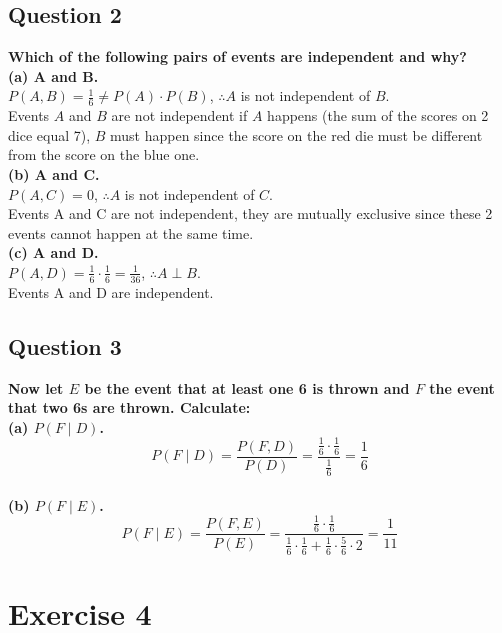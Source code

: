 \documentclass[
]{book}
\begin{document}
\section{Question 2}\label{question-2-1}

\textbf{Which of the following pairs of events are independent and why?}\\
\textbf{(a) A and B.}\\
\(P(A,B) = \frac{1}{6} \neq P(A) \cdot P(B)\), \(\therefore A\) is not independent of \(B\).\\
Events \(A\) and \(B\) are not independent if \(A\) happens (the sum of the scores on 2 dice equal 7), \(B\) must happen since the score on the red die must be different from the score on the blue one.\\

\textbf{(b) A and C.}\\
\(P(A,C) = 0\), \(\therefore A\) is not independent of \(C\).\\
Events A and C are not independent, they are mutually exclusive since these 2 events cannot happen at the same time.\\

\textbf{(c) A and D.}\\
\(P(A,D) = \frac{1}{6} \cdot \frac{1}{6} = \frac{1}{36}\), \(\therefore A \perp B\).\\
Events A and D are independent.

\section{Question 3}\label{question-3-1}

\textbf{Now let \(E\) be the event that at least one 6 is thrown and \(F\) the event that two 6s are thrown. Calculate:}\\
\textbf{(a) \(P(F \mid D)\).}\\
\[P(F \mid D) = \frac{P(F,D)}{P(D)} = \frac{\frac{1}{6} \cdot \frac{1}{6}}{\frac{1}{6}} = \frac{1}{6}\]\\
\textbf{(b) \(P(F \mid E)\).}\\
\[P(F \mid E) = \frac{P(F,E)}{P(E)} = \frac{\frac{1}{6} \cdot \frac{1}{6}}{\frac{1}{6} \cdot \frac{1}{6} + \frac{1}{6} \cdot \frac{5}{6} \cdot 2} = \frac{1}{11}\]

\chapter{Exercise 4}\label{exercise-4}
\end{document}
